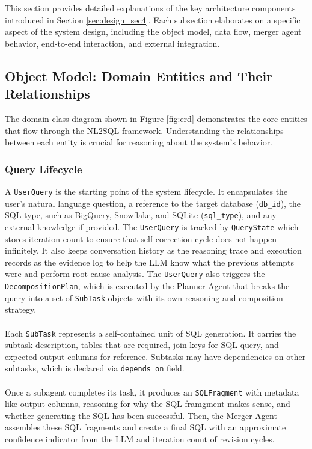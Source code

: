 This section provides detailed explanations of the key architecture components introduced in Section \ref{sec:design_sec4}. Each subsection elaborates on a specific aspect of the system design, including the object model, data flow, merger agent behavior, end-to-end interaction, and external integration.
\subsection{Object Model: Domain Entities and Their Relationships}
The domain class diagram shown in Figure \ref{fig:erd} demonstrates the core entities that flow through the NL2SQL framework. Understanding the relationships between each entity is crucial for reasoning about the system's behavior.
\subsubsection{Query Lifecycle}
A \texttt{UserQuery} is the starting point of the system lifecycle. It encapsulates the user's natural language question, a reference to the target database (\texttt{db\_id}), the SQL type, such as BigQuery, Snowflake, and SQLite (\texttt{sql\_type}), and any external knowledge if provided. The \texttt{UserQuery} is tracked by \texttt{QueryState} which stores iteration count to ensure that self-correction cycle does not happen infinitely. It also keeps conversation history as the reasoning trace and execution records as the evidence log to help the LLM know what the previous attempts were and perform root-cause analysis. The \texttt{UserQuery} also triggers the \texttt{DecompositionPlan}, which is executed by the Planner Agent that breaks the query into a set of \texttt{SubTask} objects with its own reasoning and composition strategy. 
\\ \\
Each \texttt{SubTask} represents a self-contained unit of SQL generation. It carries the subtask description, tables that are required, join keys for SQL query, and expected output columns for reference. Subtasks may have dependencies on other subtasks, which is declared via \texttt{depends\_on} field.
\\ \\
Once a subagent completes its task, it produces an \texttt{SQLFragment} with metadata like output columns, reasoning for why the SQL framgment makes sense, and whether generating the SQL has been successful. Then, the Merger Agent assembles these SQL fragments and create a final SQL with an approximate confidence indicator from the LLM and iteration count of revision cycles.
